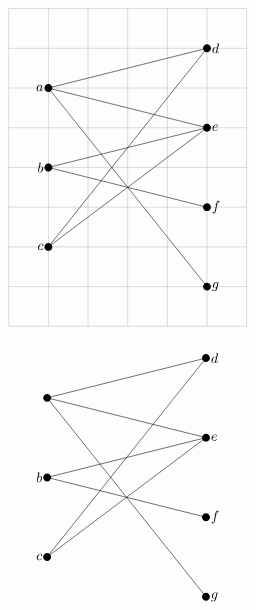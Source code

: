\documentclass{ctexart}
\begin{document}
\[
  \begin{tikzpicture}
    \tikzstyle{vertex}=[circle, fill, inner sep=2pt]
    \draw [help lines] (-1,-4) grid (5,4);
    \draw (0,2) -- (4,3); \draw (0,2) -- (4,1);
    \draw (0,2) -- (4,-3);
\draw (0,0) -- (4,1); 
\draw (0,0) -- (4,-1);
\draw (0,-2) -- (4,3);
\draw (0,-2) -- (4,1);
\node [vertex] at (0,2) {};
\node [left] at (0,2) {$a$};
\node [vertex] at (0,0) {};
\node [left] at (0,0) {$b$};
\node [vertex] at (0,-2) {};
\node [left] at (0,-2) {$c$};
\node [vertex] at (4,3) {}; %
\node [right] at (4,3) {$d$};
\node [vertex] at (4,1) {};
\node [right] at (4,1) {$e$};
\node [vertex] at (4,-1) {};
\node [right] at (4,-1) {$f$};
\node [vertex] at (4,-3) {}; 
\node [right] at (4,-3) {$g$};
\end{tikzpicture}
\]

\[
  \begin{tikzpicture}
    \tikzstyle{vertex}=[circle, fill, inner sep=2pt]
    \draw (0,2) -- (4,3); \draw (0,2) -- (4,1); \draw (0,2) -- (4,-3);
    \draw (0,0) -- (4,1); \draw (0,0) -- (4,-1);
    \draw (0,-2) -- (4,3);
    \draw (0,-2) -- (4,1);
    \node [vertex] at (0,2) {};
    \node [vertex] at (0,0) {};
    \node [left] at (0,0) {$b$};
    \node [vertex] at (0,-2) {};
    \node [left] at (0,-2) {$c$};
\node [vertex] at (4,3) {};
\node [right] at (4,3) {$d$};
\node [vertex] at (4,1) {};
\node [right] at (4,1) {$e$};
\node [vertex] at (4,-1) {};
\node [right] at (4,-1) {$f$};
\node [vertex] at (4,-3) {}; 
\node [right] at (4,-3) {$g$};
\end{tikzpicture}
\]
\end{document}
